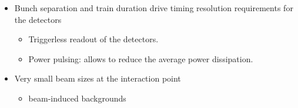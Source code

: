 \begin{frame}
 \vspace{0.5cm}
 \centering
                              


\vspace{0.3cm}

\begin{itemize}
\item Bunch separation and train duration drive timing resolution requirements for the detectors
  \begin{itemize}
  \item Triggerless readout of the detectors.
  \item Power pulsing: allows to reduce the average power dissipation.
  \end{itemize}
\item Very small beam sizes at the interaction point 
  \begin{itemize}
  \item beam-induced backgrounds
  \end{itemize}
\end{itemize}

\end{frame}


